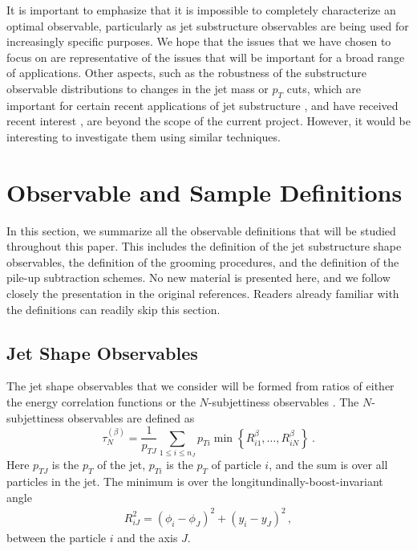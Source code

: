 \documentclass[11pt,letterpaper]{article}
\newcommand{\Nsub}[2]{\tau_{#1}^{(#2)}}
\begin{document}
It is important to emphasize that it is impossible to completely
characterize an optimal observable, particularly as jet substructure
observables are being used for increasingly specific
purposes.
%
We hope that the issues that we have chosen to focus on
are representative of the issues that will be important for a broad
range of applications.
%
Other aspects, such as the robustness of the substructure observable distributions to changes in the jet mass or $p_T$ cuts, which are important for certain recent applications of jet substructure \cite{Sirunyan:2017dgc,CMS-PAS-HIG-17-010,CMS-PAS-EXO-17-001,Sirunyan:2017dnz,Sirunyan:2017nvi,Aaboud:2018zba}, and have received recent interest \cite{Shimmin:2017mfk,Aguilar-Saavedra:2017rzt,Moult:2017okx}, are
beyond the scope of the current project.
However, it would be interesting to investigate them
using similar techniques.




\section{Observable and Sample Definitions}\label{sec:obs_def}

In this section, we summarize all the observable definitions that will be studied throughout this paper.
%
This includes the definition of the jet substructure shape observables, the definition of the grooming procedures, and the definition of the pile-up subtraction schemes.
%
No new material is presented here, and we follow closely the presentation in the original references.
%
Readers already familiar with the definitions can readily skip this section.



\subsection{Jet Shape Observables}\label{sec:shape_def}

The jet shape observables that we consider will be formed from ratios of either the energy correlation functions \cite{Larkoski:2013eya,Moult:2016cvt} or the $N$-subjettiness observables \cite{Thaler:2010tr,Thaler:2011gf}.
%
The $N$-subjettiness observables are defined as \cite{Stewart:2010tn,Thaler:2010tr,Thaler:2011gf}
%
\begin{equation}\label{eq:nsubdef}
\Nsub{N}{\beta} = \frac{1}{p_{TJ}}\sum_{1\leq i \leq n_J} p_{Ti}\min\left\{
R_{i1}^\beta,\dotsc,R_{iN}^\beta
\right\} \ .
\end{equation}
%
Here $p_{TJ}$ is the $p_T$ of the jet, $p_{Ti}$ is the $p_T$ of particle $i$, and the sum is over all particles in the jet.
%
The minimum is over the longitundinally-boost-invariant angle
%
\begin{align}
R_{iJ}^2 = (\phi_i-\phi_J)^2+(y_i-y_J)^2\,,
\end{align}
%
between the particle $i$ and the axis $J$.
\end{document}

